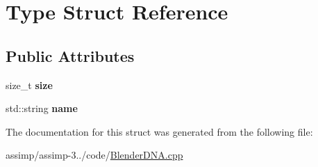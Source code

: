 \hypertarget{struct_type}{\section{Type Struct Reference}
\label{struct_type}
}
\subsection*{Public Attributes}
\begin{DoxyCompactItemize}
\item 
\hypertarget{struct_type_ab0fce70e3c1d3dad3cd8e7fe3d6c751c}{size\+\_\+t {\bfseries size}}\label{struct_type_ab0fce70e3c1d3dad3cd8e7fe3d6c751c}

\item 
\hypertarget{struct_type_ab4f0dda37f7a94508565f207638a7dcc}{std\+::string {\bfseries name}}\label{struct_type_ab4f0dda37f7a94508565f207638a7dcc}

\end{DoxyCompactItemize}


The documentation for this struct was generated from the following file\+:\begin{DoxyCompactItemize}
\item 
assimp/assimp-\/3../code/\hyperlink{_blender_d_n_a_8cpp}{Blender\+D\+N\+A.\+cpp}\end{DoxyCompactItemize}
